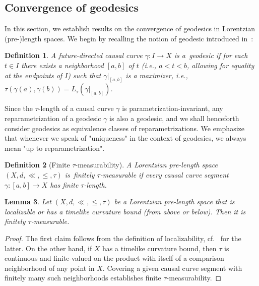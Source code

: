 \documentclass[a4paper,11pt]{article}
\numberwithin{equation}{section}
\theoremstyle{plain}
\newtheorem{Definition}{Definition}[section]
\newtheorem{Lemma}[Definition]{Lemma}
\theoremstyle{definition}
\newcommand\LpLSmaths{\ensuremath{(X, d, \ll, \leq, \tau)}}
\begin{document}
\subsection{Convergence of geodesics}\label{subsection: convergenceofgeodesics}

In this section, we establish results on the convergence of geodesics in Lorentzian (pre-)length spaces. We begin by recalling the notion of geodesic introduced in~\cite[Def.\ 1.7]{beran2022angles}: 
\begin{Definition}\label{def:geodesics}
A future-directed causal curve $\gamma \colon I \to X$ is a~\emph{geodesic\/} if for each $t \in I$ there
exists a neighborhood $[a,b]$ of $t$ (i.e., $a < t < b$, allowing for equality at the
endpoints of $I$) such that $\gamma|_{[a,b]}$ is a maximizer, i.e., $\tau(\gamma(a), \gamma(b)) =
L_\tau (\gamma|_{[a,b]})$.
\end{Definition}

Since the $\tau$-length of a causal curve $\gamma$ is parametrization-invariant, any reparametrization of a geodesic $\gamma$ is also a geodesic, and we shall henceforth consider geodesics as equivalence classes of reparametrizations. We emphasize that whenever we speak of "uniqueness" in the context of geodesics, we always mean "up to reparametrization".

\begin{Definition}[Finite $\tau$-measurability] A Lorentzian pre-length space $(X,d,\ll,\leq,\tau)$ is~\emph{finitely $\tau$-measurable\/} if every causal curve segment $\gamma \colon [a,b] \to X$ has finite $\tau$-length.
\end{Definition}

\begin{Lemma}
Let {\LpLSmaths} be a Lorentzian pre-length space that is localizable or has a timelike curvature bound (from above or below). Then it is finitely $\tau$-measurable.
\end{Lemma}
\begin{proof}
The first claim follows from the definition of localizability, cf.\ \cite[Def.\ 3.16]{kunzinger2018lorentzian} for the latter. On the other hand, if $X$ has a timelike curvature bound, then $\tau$ is continuous and finite-valued on the product with itself of a comparison neighborhood of any point in $X$. Covering a given causal curve segment with finitely many such neighborhoods establishes finite $\tau$-measurability.
\end{proof}
\end{document}
